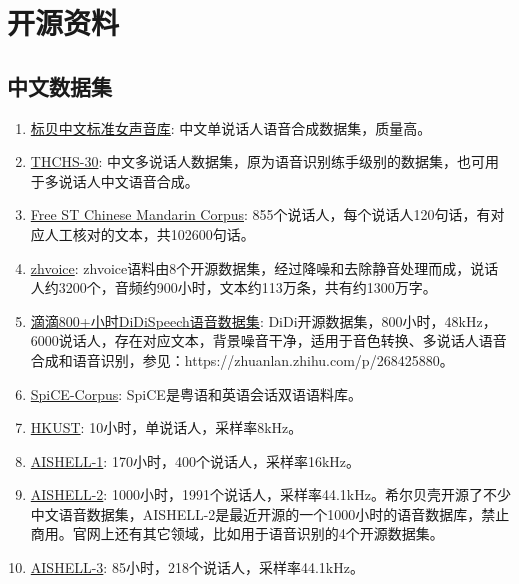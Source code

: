 \documentclass[cn,10pt,math=newtx,citestyle=gb7714-2015,bibstyle=gb7714-2015]{elegantbook}
\begin{document}
\section{开源资料}
\subsection{中文数据集}
\begin{enumerate}
  \item \href{https://www.data-baker.com/open_source.html}{标贝中文标准女声音库}: 中文单说话人语音合成数据集，质量高。
  \item \href{https://www.openslr.org/18/}{THCHS-30}: 中文多说话人数据集，原为语音识别练手级别的数据集，也可用于多说话人中文语音合成。
  \item \href{https://www.openslr.org/38/}{Free ST Chinese Mandarin Corpus}: 855个说话人，每个说话人120句话，有对应人工核对的文本，共102600句话。
  \item \href{https://github.com/KuangDD/zhvoice}{zhvoice}: zhvoice语料由8个开源数据集，经过降噪和去除静音处理而成，说话人约3200个，音频约900小时，文本约113万条，共有约1300万字。
  \item \href{https://arxiv.org/abs/2010.09275}{滴滴800+小时DiDiSpeech语音数据集}: DiDi开源数据集，800小时，48kHz，6000说话人，存在对应文本，背景噪音干净，适用于音色转换、多说话人语音合成和语音识别，参见：https://zhuanlan.zhihu.com/p/268425880。
  \item \href{https://github.com/khiajohnson/SpiCE-Corpus}{SpiCE-Corpus}: SpiCE是粤语和英语会话双语语料库。
  \item \href{http://www.paper.edu.cn/scholar/showpdf/MUT2IN4INTD0Exwh}{HKUST}: 10小时，单说话人，采样率8kHz。
  \item \href{https://www.aishelltech.com/kysjcp}{AISHELL-1}: 170小时，400个说话人，采样率16kHz。
  \item \href{http://www.aishelltech.com/aishell_2}{AISHELL-2}: 1000小时，1991个说话人，采样率44.1kHz。希尔贝壳开源了不少中文语音数据集，AISHELL-2是最近开源的一个1000小时的语音数据库，禁止商用。官网上还有其它领域，比如用于语音识别的4个开源数据集。
  \item \href{https://www.aishelltech.com/aishell_3}{AISHELL-3}: 85小时，218个说话人，采样率44.1kHz。
\end{enumerate}
\end{document}
